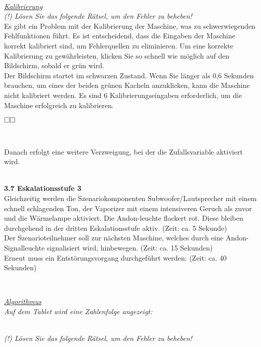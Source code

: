 {\

\underline{\emph{Kalibrierung}} \\
\emph{(!) Lösen Sie das folgende Rätsel, um den Fehler zu beheben!}\\

Es gibt ein Problem mit der Kalibrierung der Maschine, was zu schwerwiegenden Fehlfunktionen führt. Es ist entscheidend, dass die Eingaben der Maschine korrekt kalibriert sind, um Fehlerquellen zu eliminieren. Um eine korrekte Kalibrierung zu gewährleisten, klicken Sie so schnell wie möglich auf den Bildschirm, sobald er grün wird. \\
          
Der Bildschirm startet im schwarzen Zustand. Wenn Sie länger als 0,6 Sekunden brauchen, um eines der beiden grünen Kacheln anzuklicken, kann die Maschine nicht kalibriert werden. Es sind 6 Kalibrierungseingaben erforderlich, um die Maschine erfolgreich zu kalibrieren.

$\Box\hspace{85pt}\\\Box$

\

Danach erfolgt eine weitere Verzweigung, bei der die Zufallsvariable aktiviert wird. \\

\

\textbf{3.7 Eskalationsstufe 3} \\

Gleichzeitig werden die Szenariokomponenten Subwoofer/Lautsprecher mit einem schnell schlagenden Ton, der Vaporizer mit einem intensiveren Geruch als zuvor und die Wärmelampe aktiviert. Die Andon-leuchte flackert rot. Diese bleiben durchgehend in der dritten Eskalationsstufe aktiv. (Zeit: ca. 5 Sekunde) \\
Der Szenarioteilnehmer soll zur nächsten Maschine, welches durch eine Andon-Signalleuchte signalisiert wird, hinbewegen. (Zeit: ca. 15 Sekunden) \\
Erneut muss ein Entstörungsvorgang durchgeführt werden: (Zeit: ca. 40 Sekunden) 

\

\underline{\emph{Algorithmus}} \\
\emph{Auf dem Tablet wird eine Zahlenfolge angezeigt:} \\

\

\emph{(!) Lösen Sie das folgende Rätsel, um den Fehler zu beheben!} \\

}
